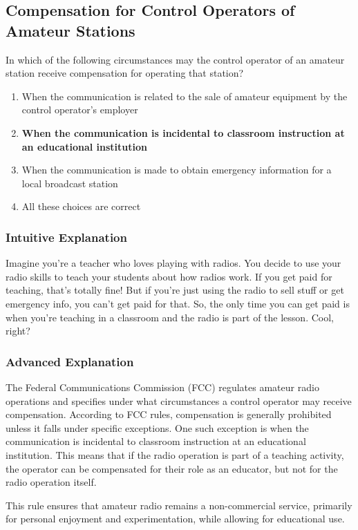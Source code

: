 \subsection{Compensation for Control Operators of Amateur Stations}
\label{T1D08}

\begin{tcolorbox}[colback=gray!10!white,colframe=black!75!black,title=T1D08]
In which of the following circumstances may the control operator of an amateur station receive compensation for operating that station?
\begin{enumerate}[label=\Alph*]
    \item When the communication is related to the sale of amateur equipment by the control operator's employer
    \item \textbf{When the communication is incidental to classroom instruction at an educational institution}
    \item When the communication is made to obtain emergency information for a local broadcast station
    \item All these choices are correct
\end{enumerate}
\end{tcolorbox}

\subsubsection{Intuitive Explanation}
Imagine you're a teacher who loves playing with radios. You decide to use your radio skills to teach your students about how radios work. If you get paid for teaching, that's totally fine! But if you're just using the radio to sell stuff or get emergency info, you can't get paid for that. So, the only time you can get paid is when you're teaching in a classroom and the radio is part of the lesson. Cool, right?

\subsubsection{Advanced Explanation}
The Federal Communications Commission (FCC) regulates amateur radio operations and specifies under what circumstances a control operator may receive compensation. According to FCC rules, compensation is generally prohibited unless it falls under specific exceptions. One such exception is when the communication is incidental to classroom instruction at an educational institution. This means that if the radio operation is part of a teaching activity, the operator can be compensated for their role as an educator, but not for the radio operation itself. 


This rule ensures that amateur radio remains a non-commercial service, primarily for personal enjoyment and experimentation, while allowing for educational use.

